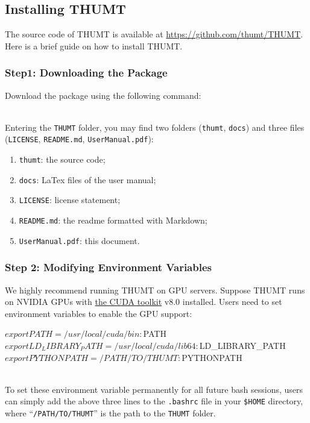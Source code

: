 \documentclass{article}
\begin{document}
\subsection{Installing THUMT}
The source code of THUMT is available at \href{https://github.com/thumt/THUMT}{https://github.com/thumt/THUMT}. Here is a brief guide on how to install THUMT.

\subsubsection{Step1: Downloading the Package}
Download the package using the following command:
\\
\\
Entering the \verb|THUMT| folder, you may find two folders (\verb|thumt|, \verb|docs|) and three files (\verb|LICENSE|, \verb|README.md|, \verb|UserManual.pdf|):
\begin{enumerate}
\item \verb|thumt|: the source code;
\item \verb|docs|: LaTex files of the user manual;
\item \verb|LICENSE|: license statement;
\item \verb|README.md|: the readme formatted with Markdown;
\item \verb|UserManual.pdf|: this document.
\end{enumerate}

\subsubsection{Step 2: Modifying Environment Variables}
We highly recommend running THUMT on GPU servers. Suppose THUMT runs on NVIDIA GPUs with \href{https://developer.nvidia.com/cuda-toolkit}{the CUDA toolkit} v8.0 installed. Users need to set environment variables to enable the GPU support:
\\
\begin{everbatim}
$ export PATH=/usr/local/cuda/bin:$PATH
$ export LD_LIBRARY_PATH=/usr/local/cuda/lib64:$LD_LIBRARY_PATH
$ export PYTHONPATH=/PATH/TO/THUMT:$PYTHONPATH
\end{everbatim}
\\
To set these environment variable permanently for all future bash sessions, users can simply add the above three lines to the \verb|.bashrc| file in your \verb|$HOME| directory, where ``\verb|/PATH/TO/THUMT|'' is the path to the \verb|THUMT| folder.
\end{document}
